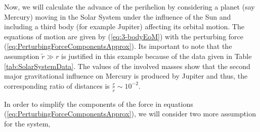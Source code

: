 Now, we will calculate the advance of the perihelion by considering a planet (say Mercury) moving in the Solar System under the influence of the Sun and including a third body (for example Jupiter) affecting its orbital motion. The equations of motion are given by (\ref{eq:3-bodyEoM}) with the perturbing force (\ref{eq:PerturbingForceComponentsApprox}). Its important to note that the assumption $\tilde{r} \gg r$ is justified in this example because of the data given in Table \ref{tab:SolarSystemData}. The values of the involved masses show that the second major gravitational influence on Mercury is produced by Jupiter and thus, the corresponding ratio of distances is $\frac{r}{\tilde{r}} \sim 10^{-2}$.

In order to simplify the components of the force in equations (\ref{eq:PerturbingForceComponentsApprox}), we will consider two more assumption for the system,
